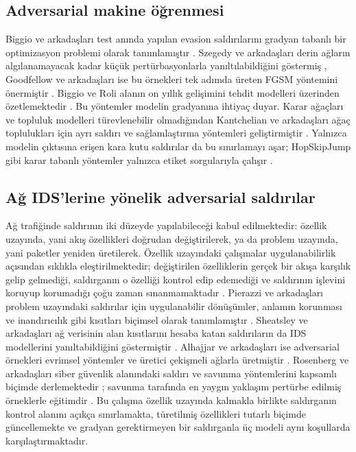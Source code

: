 \documentclass[conference]{IEEEtran}
\begin{document}
\subsection{Adversarial makine öğrenmesi}
Biggio ve arkadaşları test anında yapılan evasion saldırılarını gradyan tabanlı bir optimizasyon problemi olarak tanımlamıştır \cite{biggio2013}. Szegedy ve arkadaşları derin ağların algılanamayacak kadar küçük pertürbasyonlarla yanıltılabildiğini göstermiş \cite{szegedy2014}, Goodfellow ve arkadaşları ise bu örnekleri tek adımda üreten FGSM yöntemini önermiştir \cite{goodfellow2015}. Biggio ve Roli alanın on yıllık gelişimini tehdit modelleri üzerinden özetlemektedir \cite{biggio2018}. Bu yöntemler modelin gradyanına ihtiyaç duyar. Karar ağaçları ve topluluk modelleri türevlenebilir olmadığından Kantchelian ve arkadaşları ağaç toplulukları için ayrı saldırı ve sağlamlaştırma yöntemleri geliştirmiştir \cite{kantchelian2016}. Yalnızca modelin çıktısına erişen kara kutu saldırılar da bu sınırlamayı aşar; HopSkipJump gibi karar tabanlı yöntemler yalnızca etiket sorgularıyla çalışır \cite{chen2020}.

\subsection{Ağ IDS'lerine yönelik adversarial saldırılar}
Ağ trafiğinde saldırının iki düzeyde yapılabileceği kabul edilmektedir: özellik uzayında, yani akış özellikleri doğrudan değiştirilerek, ya da problem uzayında, yani paketler yeniden üretilerek. Özellik uzayındaki çalışmalar uygulanabilirlik açısından sıklıkla eleştirilmektedir; değiştirilen özelliklerin gerçek bir akışa karşılık gelip gelmediği, saldırganın o özelliği kontrol edip edemediği ve saldırının işlevini koruyup korumadığı çoğu zaman sınanmamaktadır \cite{apruzzese2022}. Pierazzi ve arkadaşları problem uzayındaki saldırılar için uygulanabilir dönüşümler, anlamın korunması ve inandırıcılık gibi kısıtları biçimsel olarak tanımlamıştır \cite{pierazzi2020}. Sheatsley ve arkadaşları ağ verisinin alan kısıtlarını hesaba katan saldırıların da IDS modellerini yanıltabildiğini göstermiştir \cite{sheatsley2022}. Alhajjar ve arkadaşları ise adversarial örnekleri evrimsel yöntemler ve üretici çekişmeli ağlarla üretmiştir \cite{alhajjar2021}. Rosenberg ve arkadaşları siber güvenlik alanındaki saldırı ve savunma yöntemlerini kapsamlı biçimde derlemektedir \cite{rosenberg2021}; savunma tarafında en yaygın yaklaşım pertürbe edilmiş örneklerle eğitimdir \cite{madry2018}. Bu çalışma özellik uzayında kalmakla birlikte saldırganın kontrol alanını açıkça sınırlamakta, türetilmiş özellikleri tutarlı biçimde güncellemekte ve gradyan gerektirmeyen bir saldırganla üç modeli aynı koşullarda karşılaştırmaktadır.
\end{document}
